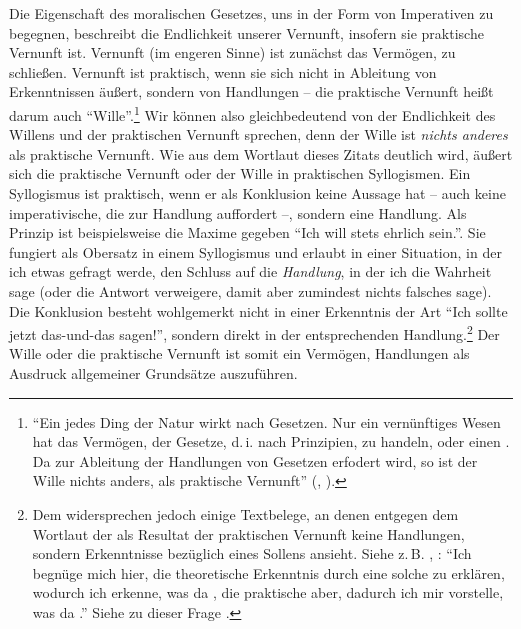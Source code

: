 Die Eigenschaft des moralischen Gesetzes, uns in der Form von Imperativen zu
begegnen, beschreibt die Endlichkeit unserer Vernunft, insofern sie praktische
Vernunft ist. Vernunft (im engeren Sinne) ist zunächst das Vermögen, zu
schließen. Vernunft ist praktisch, wenn sie sich nicht in Ableitung von
Erkenntnissen äußert, sondern von Handlungen -- die praktische Vernunft heißt
darum auch \enquote{Wille}.\footnote{\enquote{Ein jedes Ding der Natur wirkt nach Gesetzen. Nur ein vernünftiges Wesen hat
  das Vermögen,  der Gesetze, d.\,i. nach Prinzipien, zu
  handeln, oder einen . Da zur Ableitung der Handlungen von Gesetzen
   erfodert wird, so ist der Wille nichts anders, als praktische
  Vernunft} \mkbibparens{\cite[][BA 36]{Kant:GrundlegungzurMetaphysikderSitten1965},
  \cite[][IV: 412.26--30]{Kant:GesammelteWerke1900ff.}}.}
Wir können also gleichbedeutend von der Endlichkeit des Willens und der
praktischen Vernunft sprechen, denn der Wille ist \emph{nichts anderes} als
praktische Vernunft. Wie aus dem Wortlaut dieses Zitats deutlich wird, äußert
sich die praktische Vernunft oder der Wille in praktischen Syllogismen. Ein
Syllogismus ist praktisch, wenn er als Konklusion keine Aussage hat -- auch
keine imperativische, die zur Handlung auffordert --, sondern eine
Handlung. Als Prinzip ist beispielsweise die Maxime gegeben \enquote{Ich will
stets ehrlich sein.}.
Sie fungiert als Obersatz in einem Syllogismus und erlaubt in einer Situation,
in der ich etwas gefragt werde, den Schluss auf die
\emph{Handlung}, in der ich die Wahrheit sage (oder die Antwort verweigere,
damit aber zumindest nichts falsches sage).
Die Konklusion besteht wohlgemerkt nicht in einer Erkenntnis der Art \enquote{Ich sollte jetzt
das-und-das sagen!}, sondern direkt in der entsprechenden
Handlung.\footnote{Dem widersprechen jedoch einige Textbelege, an denen
 entgegen dem Wortlaut der  als
Resultat der praktischen Vernunft keine Handlungen, sondern Erkenntnisse
bezüglich eines Sollens ansieht. Siehe z.\,B.
\cite[][B 661]{Kant:KritikderreinenVernunft2003},
\cite[][III: 421.17--19]{Kant:GesammelteWerke1900ff.}:
\enquote{Ich begnüge mich hier, die theoretische Erkenntnis durch eine solche zu
erklären, wodurch ich erkenne, was da , die praktische aber, dadurch
ich mir vorstelle, was da .} Siehe zu dieser Frage
\cite{Engstrom:KantsDistinctionbetweenTheoreticalandPracticalKnowledge2002}.}
Der Wille oder die praktische Vernunft ist somit ein Vermögen, Handlungen als
Ausdruck allgemeiner Grundsätze auszuführen.

